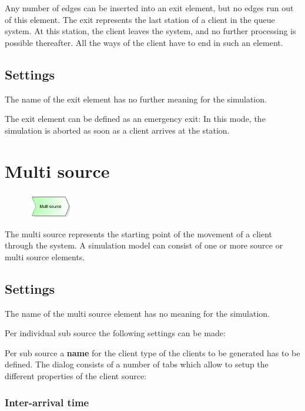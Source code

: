 Any number of edges can be inserted into an exit element, but no edges run out of this element.
The exit represents the last station of a client in the queue system.
At this station, the client leaves the system, and no further processing is possible thereafter.
All the ways of the client have to end in such an element.

\subsection*{Settings}

The name of the exit element has no further meaning for the simulation.

The exit element can be defined as an emergency exit: In this mode, the simulation is aborted
as soon as a client arrives at the station.


\section{Multi source}
\label{ref:ModelElementSourceMulti}

\begin{figure}
\vspace{-22pt}
\includegraphics[width=2cm]{imageModelElementSourceMulti.png}
\vspace{-22pt}
\end{figure}

The multi source represents the starting point of the movement of a client through the system.
A simulation model can consist of one or more source or multi source elements.

\subsection*{Settings}

The name of the multi source element has no meaning for the simulation.

Per individual sub source the following settings can be made:

Per sub source a \textbf{name} for the client type of the clients to be generated has to be defined.
The dialog consists of a number of tabs which allow to setup the different properties of the client source:

\subsubsection*{Inter-arrival time}

